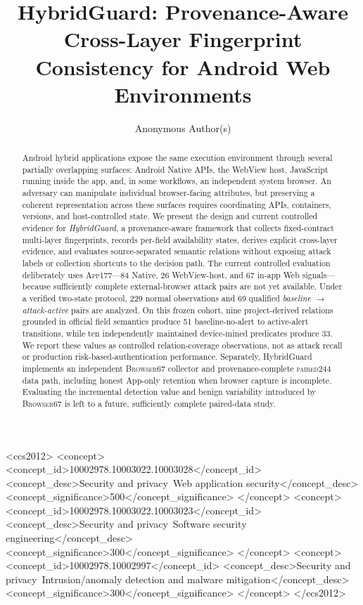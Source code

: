 \documentclass[sigconf,anonymous,review]{acmart}
\newcommand{\appfp}{\textsc{App177}\xspace}
\newcommand{\browserfp}{\textsc{Browser67}\xspace}
\newcommand{\pairedfp}{\textsc{paired244}\xspace}
\begin{document}
\title{HybridGuard: Provenance-Aware Cross-Layer Fingerprint Consistency for Android Web Environments}

\author{Anonymous Author(s)}
\renewcommand{\shortauthors}{Anonymous Author(s)}
\acmDOI{}
\acmISBN{}

\begin{abstract}
Android hybrid applications expose the same execution environment through several partially overlapping surfaces: Android Native APIs, the WebView host, JavaScript running inside the app, and, in some workflows, an independent system browser. An adversary can manipulate individual browser-facing attributes, but preserving a coherent representation across these surfaces requires coordinating APIs, containers, versions, and host-controlled state. We present the design and current controlled evidence for \emph{HybridGuard}, a provenance-aware framework that collects fixed-contract multi-layer fingerprints, records per-field availability states, derives explicit cross-layer evidence, and evaluates source-separated semantic relations without exposing attack labels or collection shortcuts to the decision path. The current controlled evaluation deliberately uses \appfp---84 Native, 26 WebView-host, and 67 in-app Web signals---because sufficiently complete external-browser attack pairs are not yet available. Under a verified two-state protocol, 229 normal observations and 69 qualified \emph{baseline $\rightarrow$ attack-active} pairs are analyzed. On this frozen cohort, nine project-derived relations grounded in official field semantics produce 51 baseline-no-alert to active-alert transitions, while ten independently maintained device-mined predicates produce 33. We report these values as controlled relation-coverage observations, not as attack recall or production risk-based-authentication performance. Separately, HybridGuard implements an independent \browserfp collector and provenance-complete \pairedfp data path, including honest App-only retention when browser capture is incomplete. Evaluating the incremental detection value and benign variability introduced by \browserfp is left to a future, sufficiently complete paired-data study.
\end{abstract}

\begin{CCSXML}
<ccs2012>
 <concept>
  <concept_id>10002978.10003022.10003028</concept_id>
  <concept_desc>Security and privacy~Web application security</concept_desc>
  <concept_significance>500</concept_significance>
 </concept>
 <concept>
  <concept_id>10002978.10003022.10003023</concept_id>
  <concept_desc>Security and privacy~Software security engineering</concept_desc>
  <concept_significance>300</concept_significance>
 </concept>
 <concept>
  <concept_id>10002978.10002997</concept_id>
  <concept_desc>Security and privacy~Intrusion/anomaly detection and malware mitigation</concept_desc>
  <concept_significance>300</concept_significance>
 </concept>
</ccs2012>
\end{CCSXML}
\end{document}
